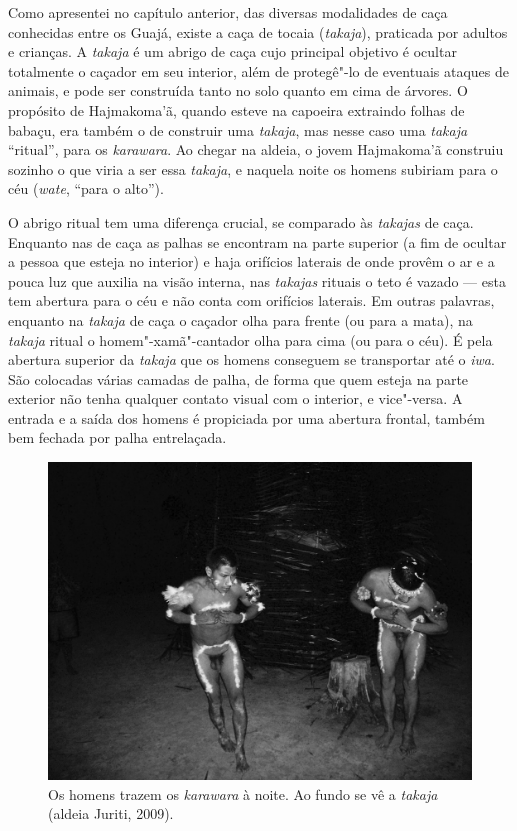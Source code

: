 Como apresentei no capítulo anterior, das diversas modalidades de caça
conhecidas entre os Guajá, existe a caça de tocaia (\emph{takaja}),
praticada por adultos e crianças. A \emph{takaja} é um abrigo de caça
cujo principal objetivo é ocultar totalmente o caçador em seu interior,
além de protegê"-lo de eventuais ataques de animais, e pode ser
construída tanto no solo quanto em cima de árvores. O propósito de
Hajmakoma'ã, quando esteve na capoeira extraindo folhas de babaçu, era
também o de construir uma \emph{takaja}, mas nesse caso uma
\emph{takaja} ``ritual'', para os \emph{karawara}. Ao chegar na aldeia, o
jovem Hajmakoma'ã construiu sozinho o que viria a ser essa
\emph{takaja}, e naquela noite os homens subiriam para o céu
(\emph{wate}, ``para o alto'').

O abrigo ritual tem uma diferença crucial, se comparado às
\emph{takajas} de caça. Enquanto nas de caça as palhas se encontram na
parte superior (a fim de ocultar a pessoa que esteja no interior) e haja
orifícios laterais de onde provêm o ar e a pouca luz que auxilia na
visão interna, nas \emph{takajas} rituais o teto é vazado --- esta tem
abertura para o céu e não conta com orifícios laterais. Em outras
palavras, enquanto na \emph{takaja} de caça o caçador olha para frente
(ou para a mata), na \emph{takaja} ritual o homem"-xamã"-cantador olha
para cima (ou para o céu). É pela abertura superior da \emph{takaja} que
os homens conseguem se transportar até o \emph{iwa}. São colocadas
várias camadas de palha, de forma que quem esteja na parte exterior não
tenha qualquer contato visual com o interior, e vice"-versa. A entrada e
a saída dos homens é propiciada por uma abertura frontal, também bem
fechada por palha entrelaçada.

\begin{figure}[H]
\centering
  \includegraphics[width=\textwidth]{./imgs/100_1695}
\caption{Os homens trazem os \emph{karawara} à noite. Ao fundo se vê a \emph{takaja} (aldeia Juriti, 2009).}
\end{figure}

